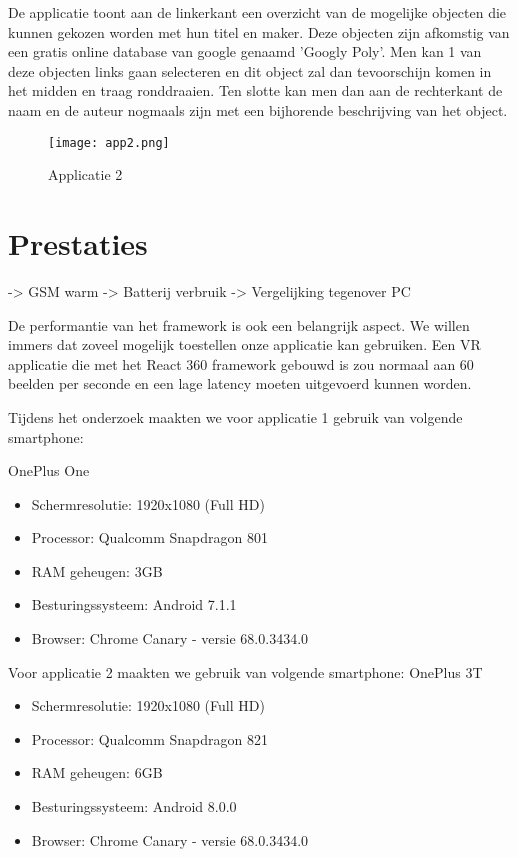 De applicatie toont aan de linkerkant een overzicht van de mogelijke objecten die kunnen gekozen worden met hun titel en maker. Deze objecten zijn afkomstig van een gratis online database van google genaamd 'Googly Poly'. Men kan 1 van deze objecten links gaan selecteren en dit object zal dan tevoorschijn komen in het midden en traag ronddraaien. Ten slotte kan men dan aan de rechterkant de naam en de auteur nogmaals zijn met een bijhorende beschrijving van het object.

\begin{figure}[H]
	\centering
	\texttt{[image: app2.png]}
	\caption{Applicatie 2}
	\label{fig:app2}
\end{figure}

\section{Prestaties}
\label{sec:prestaties}
-> GSM warm
-> Batterij verbruik
-> Vergelijking tegenover PC

De performantie van het framework is ook een belangrijk aspect. We willen immers dat zoveel mogelijk toestellen onze applicatie kan gebruiken. Een VR applicatie die met het React 360 framework gebouwd is zou normaal aan 60 beelden per seconde en een lage latency moeten uitgevoerd kunnen worden.

Tijdens het onderzoek maakten we voor applicatie 1 gebruik van volgende smartphone:

OnePlus One 
\begin{itemize}
	\item Schermresolutie: 1920x1080 (Full HD)
	\item Processor: Qualcomm Snapdragon 801
	\item RAM geheugen: 3GB
	\item Besturingssysteem: Android 7.1.1
	\item Browser: Chrome Canary - versie 68.0.3434.0
\end{itemize}

Voor applicatie 2 maakten we gebruik van volgende smartphone:
OnePlus 3T
\begin{itemize}
	\item Schermresolutie: 1920x1080 (Full HD)
	\item Processor: Qualcomm Snapdragon 821
	\item RAM geheugen: 6GB
	\item Besturingssysteem: Android 8.0.0
	\item Browser: Chrome Canary - versie 68.0.3434.0
\end{itemize}


